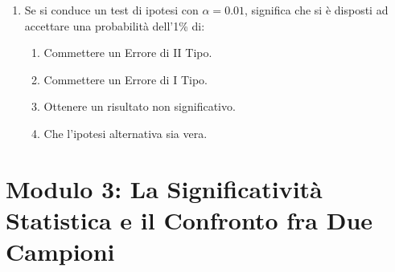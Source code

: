 \documentclass[12pt, a4paper]{article}
\begin{document}
\begin{enumerate}[resume]
    \item Se si conduce un test di ipotesi con $\alpha = 0.01$, significa che si è disposti ad accettare una probabilità dell'1\% di:
    \begin{enumerate}
        \item Commettere un Errore di II Tipo.
        \item Commettere un Errore di I Tipo.
        \item Ottenere un risultato non significativo.
        \item Che l'ipotesi alternativa sia vera.
    \end{enumerate}
    \vspace{0.3cm}
\end{enumerate}

\section*{Modulo 3: La Significatività Statistica e il Confronto fra Due Campioni}
\end{document}
